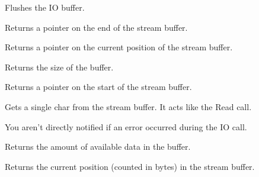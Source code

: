 
Flushes the IO buffer.


\label{wxstreambuffergetbufferend}


Returns a pointer on the end of the stream buffer.


\label{wxstreambuffergetbufferpos}


Returns a pointer on the current position of the stream buffer.


\label{wxstreambuffergetbuffersize}


Returns the size of the buffer.


\label{wxstreambuffergetbufferstart}


Returns a pointer on the start of the stream buffer.


\label{wxstreambuffergetchar}


Gets a single char from the stream buffer. It acts like the Read call.


You aren't directly notified if an error occurred during the IO call.




\label{wxstreambuffergetdataleft}


Returns the amount of available data in the buffer.


\label{wxstreambuffergetintposition}


Returns the current position (counted in bytes) in the stream buffer.


\label{wxstreambuffergetlastaccess}

